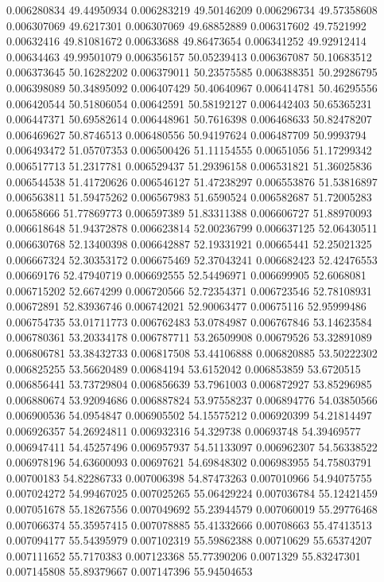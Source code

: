 0.006280834	49.44950934
0.006283219	49.50146209
0.006296734	49.57358608
0.006307069	49.6217301
0.006307069	49.68852889
0.006317602	49.7521992
0.00632416	49.81081672
0.00633688	49.86473654
0.006341252	49.92912414
0.00634463	49.99501079
0.006356157	50.05239413
0.006367087	50.10683512
0.006373645	50.16282202
0.006379011	50.23575585
0.006388351	50.29286795
0.006398089	50.34895092
0.006407429	50.40640967
0.006414781	50.46295556
0.006420544	50.51806054
0.00642591	50.58192127
0.006442403	50.65365231
0.006447371	50.69582614
0.006448961	50.7616398
0.006468633	50.82478207
0.006469627	50.8746513
0.006480556	50.94197624
0.006487709	50.9993794
0.006493472	51.05707353
0.006500426	51.11154555
0.00651056	51.17299342
0.006517713	51.2317781
0.006529437	51.29396158
0.006531821	51.36025836
0.006544538	51.41720626
0.006546127	51.47238297
0.006553876	51.53816897
0.006563811	51.59475262
0.006567983	51.6590524
0.006582687	51.72005283
0.00658666	51.77869773
0.006597389	51.83311388
0.006606727	51.88970093
0.006618648	51.94372878
0.006623814	52.00236799
0.006637125	52.06430511
0.006630768	52.13400398
0.006642887	52.19331921
0.00665441	52.25021325
0.006667324	52.30353172
0.006675469	52.37043241
0.006682423	52.42476553
0.00669176	52.47940719
0.006692555	52.54496971
0.006699905	52.6068081
0.006715202	52.6674299
0.006720566	52.72354371
0.006723546	52.78108931
0.00672891	52.83936746
0.006742021	52.90063477
0.00675116	52.95999486
0.006754735	53.01711773
0.006762483	53.0784987
0.006767846	53.14623584
0.006780361	53.20334178
0.006787711	53.26509908
0.00679526	53.32891089
0.006806781	53.38432733
0.006817508	53.44106888
0.006820885	53.50222302
0.006825255	53.56620489
0.00684194	53.6152042
0.006853859	53.6720515
0.006856441	53.73729804
0.006856639	53.7961003
0.006872927	53.85296985
0.006880674	53.92094686
0.006887824	53.97558237
0.006894776	54.03850566
0.006900536	54.0954847
0.006905502	54.15575212
0.006920399	54.21814497
0.006926357	54.26924811
0.006932316	54.329738
0.00693748	54.39469577
0.006947411	54.45257496
0.006957937	54.51133097
0.006962307	54.56338522
0.006978196	54.63600093
0.00697621	54.69848302
0.006983955	54.75803791
0.00700183	54.82286733
0.007006398	54.87473263
0.007010966	54.94075755
0.007024272	54.99467025
0.007025265	55.06429224
0.007036784	55.12421459
0.007051678	55.18267556
0.007049692	55.23944579
0.007060019	55.29776468
0.007066374	55.35957415
0.007078885	55.41332666
0.00708663	55.47413513
0.007094177	55.54395979
0.007102319	55.59862388
0.00710629	55.65374207
0.007111652	55.7170383
0.007123368	55.77390206
0.0071329	55.83247301
0.007145808	55.89379667
0.007147396	55.94504653
